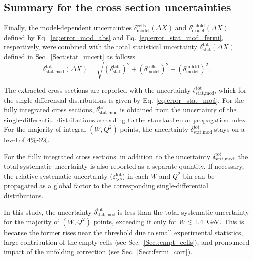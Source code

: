 \documentclass[prc,twocolumn,superscriptaddress,showpacs,amssymb,amsmath,amsfonts,aps,nofootinbib]{revtex4-1}
\begin{document}
\subsection{Summary for the cross section uncertainties}
\label{Sect:uncert_resume}


Finally, the model-dependent uncertainties $\delta^{\text{cells}}_{\text{model}}(\Delta X)$ and $\delta^{\text{unfold}}_{\text{model}}(\Delta X)$ defined by Eq.\!~\eqref{eq:error_mod_abs} and Eq.\!~\eqref{eq:error_stat_mod_fermi}, respectively, were combined with the total statistical uncertainty $\delta_{\text{stat}}^{\text{tot}}(\Delta X)$ defined in Sec.\!~\ref{Sect:stat_uncert} as follows,
\begin{equation}
\delta_{\text{stat,mod}}^{\text{tot}} (\Delta X) =
\sqrt{\left (\delta_{\text{stat}}^{\text{tot}} \right )^{2} + \left (\delta^{\text{cells}}_{\text{model}}\right )^{2} + \left (\delta^{\text{unfold}}_{\text{model}}\right )^{2}}.
\label{eq:error_stat_mod}
\end{equation}


The extracted cross sections are reported with the uncertainty $\delta_{\text{stat,mod}}^{\text{tot}}$, which for the single-differential distributions is given by Eq.\!~\eqref{eq:error_stat_mod}. For the fully integrated cross sections, $\delta_{\text{stat,mod}}^{\text{tot}}$ is obtained from the uncertainty of the single-differential distributions according to the standard error propagation rules. For the majority of integral $(W,Q^{2})$ points, the uncertainty $\delta_{\text{stat,mod}}^{\text{tot}}$ stays on a level of 4\%-6\%.


For the fully integrated cross sections, in addition~to the uncertainty $\delta_{\text{stat,mod}}^{\text{tot}}$, the total systematic uncertainty is also reported as a separate quantity. If necessary, the relative systematic uncertainty ($\varepsilon_{\text{sys}}^{\text{tot}}$) in each $W$ and $Q^{2}$ bin can be propagated as a global factor to the corresponding single-differential distributions.


In this study, the uncertainty $\delta_{\text{stat,mod}}^{\text{tot}}$ is less than the total systematic uncertainty for the majority of $(W,Q^{2})$ points, exceeding it only for $W \lesssim 1.4$~GeV. This is because the former rises near the threshold due to small experimental statistics, large contribution of the empty cells (see Sec.\!~\ref{Sect:empt_cells}), and pronounced impact of the unfolding correction (see Sec.\!~\ref{Sect:fermi_corr}).
\end{document}
